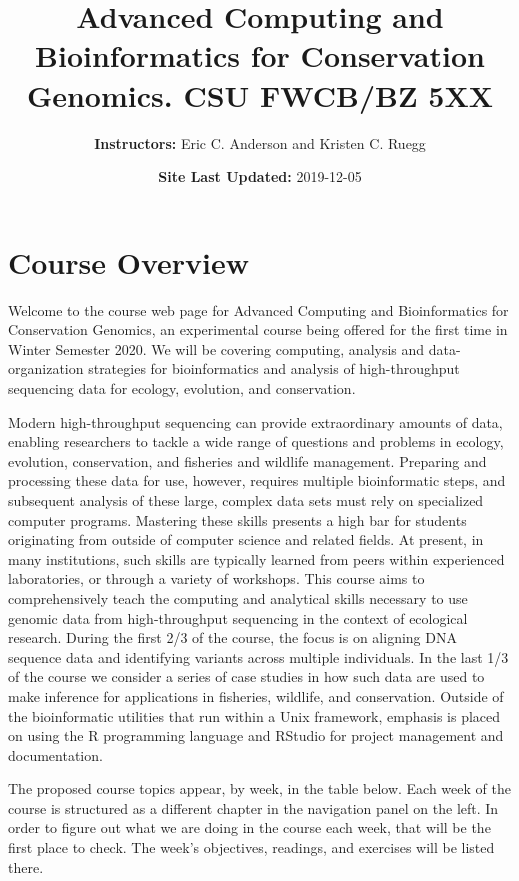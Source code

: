 \documentclass[]{book}
\title{Advanced Computing and Bioinformatics for Conservation Genomics. CSU FWCB/BZ 5XX}
\author{\textbf{Instructors:} Eric C. Anderson and Kristen C. Ruegg}
\date{\textbf{Site Last Updated:} 2019-12-05}
\begin{document}
\maketitle

{
\setcounter{tocdepth}{1}
\tableofcontents
}
\hypertarget{course-overview}{%
\chapter*{Course Overview}\label{course-overview}}

Welcome to the course web page for Advanced Computing and Bioinformatics for Conservation Genomics,
an experimental course being offered for the first time in Winter Semester 2020. We will be covering
computing, analysis and data-organization strategies for bioinformatics and analysis of high-throughput sequencing data for ecology,
evolution, and conservation.

Modern high-throughput sequencing can provide extraordinary amounts of data, enabling researchers to tackle a wide range of questions and problems in ecology, evolution, conservation, and fisheries and wildlife management. Preparing and processing these data for use, however, requires multiple bioinformatic steps, and subsequent analysis of these large, complex data sets must rely on specialized computer programs. Mastering these skills presents a high bar for students originating from outside of computer science and related fields. At present, in many institutions, such skills are typically learned from peers within experienced laboratories, or through a variety of workshops. This course aims to comprehensively teach the computing and analytical skills necessary to use genomic data from high-throughput sequencing in the context of ecological research. During the first 2/3 of the course, the focus is on aligning DNA sequence data and identifying variants across multiple individuals. In the last 1/3 of the course we consider a series of case studies in how such data are used to make inference for applications in fisheries, wildlife, and conservation. Outside of the bioinformatic utilities that run within a Unix framework, emphasis is placed on using the R programming language and RStudio for project management and documentation.

The proposed course
topics appear, by week, in the table below. Each week of the course is structured as a different
chapter in the navigation panel on the left. In order to figure out what we are doing in the course
each week, that will be the first place to check. The week's objectives, readings, and exercises will
be listed there.
\end{document}
